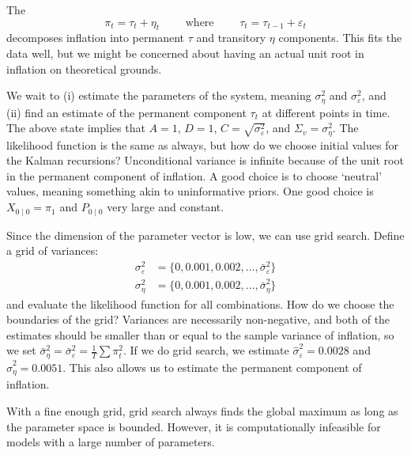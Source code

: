 \documentclass[10pt]{article}
\begin{document}
\begin{example}
	 The  \[ \pi_t = \tau_t + \eta_t \qquad \text{ where } \qquad \tau_t = \tau_{t-1} + \varepsilon_t\]decomposes inflation into permanent $\tau$ and transitory $\eta$ components. This fits the data well, but we might be concerned about having an actual unit root in inflation on theoretical grounds.
	
	We wait to (i) estimate the parameters of the system, meaning $\sigma_\eta^2$ and $\sigma_\varepsilon^2$, and (ii) find an estimate of the permanent component $\tau_t$ at different points in time. The above state implies that $A=1$, $D=1$, $C=\sqrt{\sigma_\varepsilon^2}$, and $\Sigma_v = \sigma^2_\eta$. The likelihood function is the same as always, but how do we choose initial values for the Kalman recursions? Unconditional variance is infinite because of the unit root in the permanent component of inflation. A good choice is to choose `neutral' values, meaning something akin to uninformative priors. One good choice is $X_{0\mid0} = \pi_1$ and $P_{0\mid0}$ very large and constant.
	
	Since the dimension of the parameter vector is low, we can use grid search. Define a grid of variances:\begin{align*} \sigma_\varepsilon^2 &= \{0,0.001,0.002,\dots,\bar{\sigma}_\varepsilon^2\} \\ \sigma_\eta^2 &= \{0,0.001,0.002,\dots,\bar{\sigma}_\eta^2\}\end{align*}and evaluate the likelihood function for all combinations. How do we choose the boundaries of the grid? Variances are necessarily non-negative, and both of the estimates should be smaller than or equal to the sample variance of inflation, so we set $\bar{\sigma}_\eta^2 = \bar{\sigma}_\varepsilon^2 = \frac{1}{T}\sum \pi_t^2$. If we do grid search, we estimate $\hat{\sigma}^2_\varepsilon = 0.0028$ and $\hat{\sigma}^2_\eta = 0.0051$. This also allows us to estimate the permanent component of inflation.
\end{example}

\begin{remark}
	With a fine enough grid, grid search always finds the global maximum as long as the parameter space is bounded. However, it is computationally infeasible for models with a large number of parameters.
\end{remark}
\end{document}
